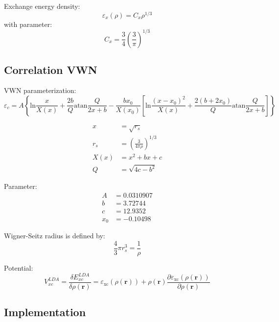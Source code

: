 Exchange energy density:
\begin{equation}
\varepsilon_{x}(\rho) = C_{x}\rho^{1/3}
\end{equation}
with parameter:
\begin{equation}
C_{x} = \frac{3}{4}\left(\frac{3}{\pi}\right)^{1/3}  
\end{equation}


\subsection{Correlation VWN}

VWN parameterization:
\begin{equation}
\varepsilon_{c} = A \left\{
\mathrm{ln}\frac{x}{X(x)} + \frac{2b}{Q}\mathrm{atan}\frac{Q}{2x+b}
- \frac{bx_{0}}{X(x_{0})}\left[
\mathrm{ln}\frac{(x - x_0)^2}{X(x)} + \frac{2(b + 2x_0)}{Q}\mathrm{atan}\frac{Q}{2x + b}
\right]
\right\}
\end{equation}

\begin{align}
x & = \sqrt{r_{s}} \\
r_s & = \left( \frac{3}{4\pi\rho} \right)^{1/3} \\
X(x) & = x^2 + bx + c \\
Q & = \sqrt{4c - b^2}
\end{align}

Parameter:
\begin{align}
A & = 0.0310907 \\
b & = 3.72744 \\
c & = 12.9352 \\
x_0 & = -0.10498
\end{align}

Wigner-Seitz radius is defined by:
\begin{equation}
\frac{4}{3}\pi r^{3}_{s} = \frac{1}{\rho}
\end{equation}

Potential:
\begin{equation}
V^{LDA}_{xc} = \frac{\delta E^{LDA}_{xc}}{\delta \rho(\mathbf{r})} = 
\varepsilon_{\mathrm{xc}}( \rho(\mathbf{r}) ) + \rho(\mathbf{r})
\frac{\partial \varepsilon_{\mathrm{xc}}( \rho(\mathbf{r}) )}{\partial\rho(\mathbf{r})}
\end{equation}


\subsection{Implementation}

